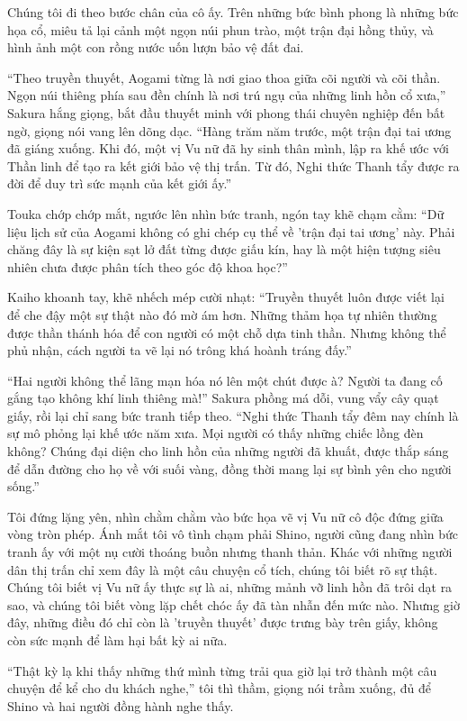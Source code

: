 \documentclass[../main.tex]{subfiles}
\begin{document}
Chúng tôi đi theo bước chân của cô ấy. Trên những bức bình phong là những bức họa cổ, miêu tả lại cảnh một ngọn núi phun trào, một trận đại hồng thủy, và hình ảnh một con rồng nước uốn lượn bảo vệ đất đai.

``Theo truyền thuyết, Aogami từng là nơi giao thoa giữa cõi người và cõi thần. Ngọn núi thiêng phía sau đền chính là nơi trú ngụ của những linh hồn cổ xưa,'' Sakura hắng giọng, bắt đầu thuyết minh với phong thái chuyên nghiệp đến bất ngờ, giọng nói vang lên dõng dạc. ``Hàng trăm năm trước, một trận đại tai ương đã giáng xuống. Khi đó, một vị Vu nữ đã hy sinh thân mình, lập ra khế ước với Thần linh để tạo ra kết giới bảo vệ thị trấn. Từ đó, Nghi thức Thanh tẩy được ra đời để duy trì sức mạnh của kết giới ấy.''

Touka chớp chớp mắt, ngước lên nhìn bức tranh, ngón tay khẽ chạm cằm: ``Dữ liệu lịch sử của Aogami không có ghi chép cụ thể về 'trận đại tai ương' này. Phải chăng đây là sự kiện sạt lở đất từng được giấu kín, hay là một hiện tượng siêu nhiên chưa được phân tích theo góc độ khoa học?''

Kaiho khoanh tay, khẽ nhếch mép cười nhạt: ``Truyền thuyết luôn được viết lại để che đậy một sự thật nào đó mờ ám hơn. Những thảm họa tự nhiên thường được thần thánh hóa để con người có một chỗ dựa tinh thần. Nhưng không thể phủ nhận, cách người ta vẽ lại nó trông khá hoành tráng đấy.''

``Hai người không thể lãng mạn hóa nó lên một chút được à? Người ta đang cố gắng tạo không khí linh thiêng mà!'' Sakura phồng má dỗi, vung vẩy cây quạt giấy, rồi lại chỉ sang bức tranh tiếp theo. ``Nghi thức Thanh tẩy đêm nay chính là sự mô phỏng lại khế ước năm xưa. Mọi người có thấy những chiếc lồng đèn không? Chúng đại diện cho linh hồn của những người đã khuất, được thắp sáng để dẫn đường cho họ về với suối vàng, đồng thời mang lại sự bình yên cho người sống.''

Tôi đứng lặng yên, nhìn chằm chằm vào bức họa vẽ vị Vu nữ cô độc đứng giữa vòng tròn phép. Ánh mắt tôi vô tình chạm phải Shino, người cũng đang nhìn bức tranh ấy với một nụ cười thoáng buồn nhưng thanh thản. Khác với những người dân thị trấn chỉ xem đây là một câu chuyện cổ tích, chúng tôi biết rõ sự thật. Chúng tôi biết vị Vu nữ ấy thực sự là ai, những mảnh vỡ linh hồn đã trôi dạt ra sao, và chúng tôi biết vòng lặp chết chóc ấy đã tàn nhẫn đến mức nào. Nhưng giờ đây, những điều đó chỉ còn là 'truyền thuyết' được trưng bày trên giấy, không còn sức mạnh để làm hại bất kỳ ai nữa.

``Thật kỳ lạ khi thấy những thứ mình từng trải qua giờ lại trở thành một câu chuyện để kể cho du khách nghe,'' tôi thì thầm, giọng nói trầm xuống, đủ để Shino và hai người đồng hành nghe thấy.
\end{document}
